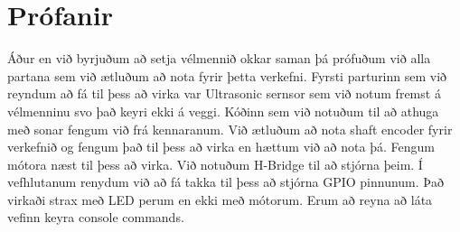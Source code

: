 \section{Prófanir}
Áður en við byrjuðum að setja vélmennið okkar saman þá prófuðum við alla partana sem við ætluðum að nota fyrir þetta verkefni. Fyrsti parturinn sem við reyndum að fá til þess að virka var Ultrasonic sernsor sem við notum fremst á vélmenninu svo það keyri ekki á veggi. Kóðinn sem við notuðum til að athuga með sonar fengum við frá kennaranum. Við ætluðum að nota shaft encoder fyrir verkefnið og fengum það til þess að virka en hættum við að nota þá. Fengum mótora næst til þess að virka. Við notuðum H-Bridge til að stjórna þeim. Í vefhlutanum renydum við að fá takka til þess að stjórna GPIO pinnunum. Það virkaði strax með LED perum en ekki með mótorum. Erum að reyna að láta vefinn keyra console commands.  
